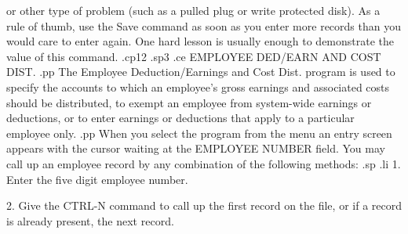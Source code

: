 or other type of problem (such as a pulled plug or write protected
disk).	As a rule of thumb, use the Save command as soon as you
enter more records than you would care to enter again. One hard
lesson is usually enough to demonstrate the value of this command.
.cp12
.sp3
.ce
EMPLOYEE DED/EARN AND COST DIST.
.pp
The Employee Deduction/Earnings and Cost Dist. program is used
to specify the accounts to which an employee's gross earnings and
associated costs should be distributed, to exempt an employee from
system-wide earnings or deductions, or to enter earnings or deductions
that apply to a particular employee only.
.pp
When you select the program from the menu an entry screen appears with the
cursor waiting at the EMPLOYEE NUMBER field.  You may call up an
employee record by any combination of the following methods:
.sp
.li
		1. Enter the five digit employee number.

		2. Give the CTRL-N command to call up the
		   first record on the file, or if a record
		   is already present, the next record.

